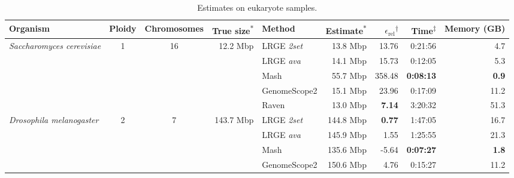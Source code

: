 \documentclass[unnumsec,webpdf,modern,large]{oup-authoring-template}
\theoremstyle{thmstyleone}%
\theoremstyle{thmstyletwo}%
\theoremstyle{thmstylethree}%
\newcommand{\lrge}{LRGE}
\newcommand{\relerr}{$\epsilon_{\text{rel}}$}
\newcommand{\ava}{\textit{ava}}
\newcommand{\twoset}{\textit{2set}}
\begin{document}
\begin{table}[t]
\caption{Estimates on eukaryote samples.\label{tab:euk}}
\begin{tabular*}{\textwidth}{@{}lccrlrrrr@{}}
\toprule
Organism                                  & Ploidy             & Chromosomes          & True size\textsuperscript{$\ast$}                   & Method      & Estimate\textsuperscript{$\ast$}    & \relerr{}\textsuperscript{$\dagger$} & Time\textsuperscript{$\ddagger$} & Memory (GB) \\ \midrule
\multirow{5}{*}{\textit{Saccharomyces cerevisiae}} & \multirow{5}{*}{1} & \multirow{5}{*}{16} & \multirow{5}{*}{12.2 Mbp}  & \lrge{} \twoset{}   & 13.8 Mbp  & 13.76          & 0:21:56  & 4.7              \\
                                                   &                    &                     &                              & \lrge{} \ava{}    & 14.1 Mbp  & 15.73          & 0:12:05  & 5.3              \\
                                                   &                    &                     &                              & Mash              & 55.7 Mbp  & 358.48         & \textbf{0:08:13}  & \textbf{0.9}             \\
                                                   &                    &                     &                              & GenomeScope2      & 15.1 Mbp  & 23.96          & 0:17:09  & 11.2             \\
                                                   &                    &                     &                              & Raven             & 13.0 Mbp  & \textbf{7.14}          & 3:20:32 & 51.3             \\ \midrule
\multirow{5}{*}{\textit{Drosophila melanogaster}}  & \multirow{5}{*}{2} & \multirow{5}{*}{7}  & \multirow{5}{*}{143.7 Mbp} & \lrge{} \twoset{}   & 144.8 Mbp & \textbf{0.77}          & 1:47:05  & 16.7              \\
                                                   &                    &                     &                              & \lrge{} \ava{}    & 145.9 Mbp & 1.55          & 1:25:55  & 21.3              \\
                                                   &                    &                     &                              & Mash              & 135.6 Mbp & -5.64          & \textbf{0:07:27}  & \textbf{1.8}              \\
                                                   &                    &                     &                              & GenomeScope2      & 150.6 Mbp & 4.76         & 0:15:27  & 11.2             \\

\end{tabular*}
\end{table}
\end{document}
